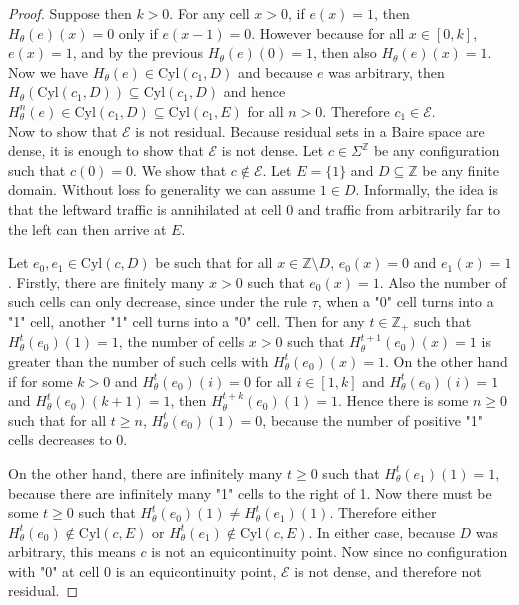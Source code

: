 \documentclass[runningheads]{llncs}
\newcommand{\Z}{\mathbb{Z}}
\begin{document}
\begin{proof}
Suppose then $k> 0$. For any cell $x>0$, if $e(x)=1$, then $H_\theta(e)(x)=0$ only if $e(x-1) = 0$. However because for all $x \in [0,k]$, $e(x)=1$, and by the previous $H_\theta(e)(0)=1$, then also $H_\theta(e)(x) = 1$. Now we have $H_\theta (e) \in \mathrm{Cyl} (c_1, D)$ and because $e$ was arbitrary, then $H_\theta (\mathrm{Cyl} (c_1, D) ) \subseteq \mathrm{Cyl} (c_1, D)$ and hence $H_\theta ^n (e) \in \mathrm{Cyl} (c_1, D) \subseteq \mathrm{Cyl} (c_1, E)$ for all $n>0$. Therefore $c_1 \in \mathcal{E}$.\\

Now to show that $\mathcal{E}$ is not residual. Because residual sets in a Baire space are dense, it is enough to show that $\mathcal{E}$ is not dense. Let $c \in \Sigma^\Z$ be any configuration such that $c(0) = 0$. We show that $c \notin \mathcal{E}$. Let $E = \{1\}$ and $D \subseteq \Z$ be any finite domain. Without loss fo generality we can assume $1 \in D$. Informally, the idea is that the leftward traffic is annihilated at cell $0$ and traffic from arbitrarily far to the left can then arrive at $E$. 

Let $e_0,e_1\in \mathrm{Cyl}(c,D)$ be such that for all $x \in \Z \setminus D$, $e_0(x) = 0$ and $e_1(x) = 1$. Firstly, there are finitely many $x>0$ such that $e_0(x) = 1$. Also the number of such cells can only decrease, since under the rule $\tau$, when a "0" cell turns into a "1" cell, another "1" cell turns into a "0" cell. Then for any $t\in \Z_+$ such that $H_\theta^t (e_0)(1) = 1$, the number of cells $x>0$ such that $H_\theta^{t+1} (e_0)(x) = 1$ is greater than the number of such cells with $H_\theta^{t} (e_0)(x) = 1$. On the other hand if for some $k>0$ and $H_\theta^t (e_0)(i) = 0$ for all $i \in [1,k]$ and $H_\theta^t (e_0)(i) = 1$ and $H_\theta^t (e_0)(k+1)=1$, then $H_\theta^{t+k} (e_0)(1) = 1$. Hence there is some $n\geq 0$ such that for all $t\geq n$, $H_\theta^{t} (e_0)(1) = 0$, because the number of positive "1" cells decreases to 0.

On the other hand, there are infinitely many $t \geq 0$ such that $H_\theta^t (e_1)(1) = 1$, because there are infinitely many "1" cells to the right of 1.   Now there must be some $t\geq 0$ such that $H_\theta^t(e_0)(1) \neq H_\theta^t(e_1)(1)$. Therefore either $H_\theta^t (e_0) \notin \mathrm{Cyl}(c,E)$ or $H_\theta^t(e_1) \notin \mathrm{Cyl}(c,E)$. In either case, because $D$ was arbitrary, this means $c$ is not an equicontinuity point. Now since no configuration with "0" at cell 0 is an equicontinuity point, $\mathcal{E}$ is not dense, and therefore not residual.


\end{proof}
\end{document}
